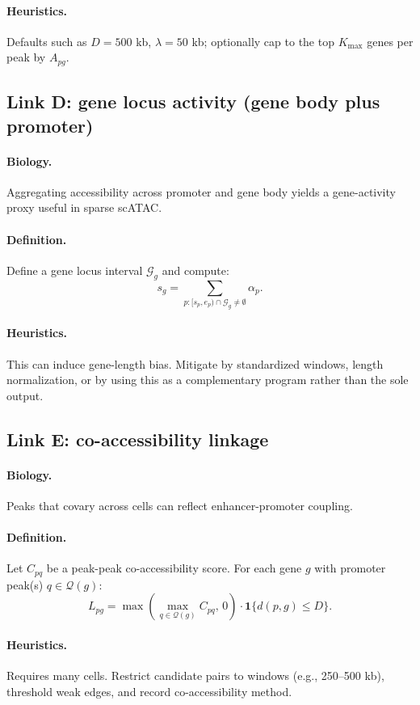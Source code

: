 \documentclass[11pt]{article}
\begin{document}
\paragraph{Heuristics.} Defaults such as $D=500$ kb, $\lambda=50$ kb; optionally cap to the top $K_{\max}$ genes per peak by $A_{pg}$.

\subsection{Link D: gene locus activity (gene body plus promoter)}
\paragraph{Biology.} Aggregating accessibility across promoter and gene body yields a gene-activity proxy useful in sparse scATAC.
\paragraph{Definition.} Define a gene locus interval $\mathcal{G}_g$ and compute:
\[
s_g = \sum_{p: [s_p,e_p) \cap \mathcal{G}_g \neq \emptyset} \alpha_p.
\]
\paragraph{Heuristics.} This can induce gene-length bias. Mitigate by standardized windows, length normalization, or by using this as a complementary program rather than the sole output.

\subsection{Link E: co-accessibility linkage}
\paragraph{Biology.} Peaks that covary across cells can reflect enhancer-promoter coupling.
\paragraph{Definition.} Let $C_{pq}$ be a peak-peak co-accessibility score. For each gene $g$ with promoter peak(s) $q \in \mathcal{Q}(g)$:
\[
L_{pg} = \max\left(\max_{q \in \mathcal{Q}(g)} C_{p q},\, 0\right)\cdot \mathbf{1}\{d(p,g)\le D\}.
\]
\paragraph{Heuristics.} Requires many cells. Restrict candidate pairs to windows (e.g., 250--500 kb), threshold weak edges, and record co-accessibility method.
\end{document}

